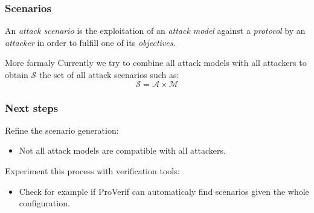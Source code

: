 \documentclass{beamer}
\begin{document}
\begin{frame}
    \frametitle{Scenarios}

    An {\em attack scenario} is the exploitation of an {\em attack model} against a {\em protocol}
    by an {\em attacker} in order to fulfill one of its {\em objectives}.
    \vfill
    \begin{block}{More formaly}
        Currently we try to combine all attack models with all attackers to obtain $\mathcal{S}$
        the set of all attack scenarios such as:
        $$\mathcal{S} = \mathcal{A} \times \mathcal{M}$$
    \end{block}
\end{frame}

\begin{frame}
    \frametitle{Next steps}

    Refine the scenario generation:
    \begin{itemize}
        \item Not all attack models are compatible with all attackers.
    \end{itemize}
    \vfill
    Experiment this process with verification tools:
    \begin{itemize}
        \item Check for example if ProVerif can automaticaly find scenarios given the whole configuration.
    \end{itemize}
\end{frame}
\end{document}
